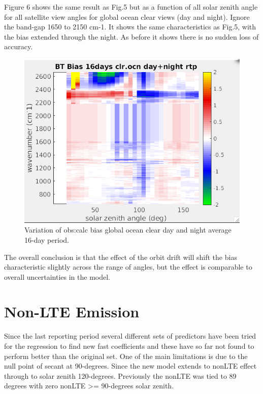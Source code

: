 \documentclass[11pt,twocolumn]{article}
\begin{document}
Figure 6 shows the same result as Fig.5 but as a function of all solar zenith angle
for all satellite view angles for global ocean clear views (day and night). Ignore
the band-gap 1650 to 2150 cm-1. It shows the same characteristics as Fig.5,
with the bias extended through the night. As before it shows there is no sudden
loss of accuracy.

\begin{figure}[htbp]
\centering
\includegraphics[width=\linewidth]{./Figs/airs_oc_bias_vs_solzen_day_night_glob_ocn_clr.png}
\caption{\label{fig:orgcb99237}Variation of obs:calc bias global ocean clear day and night average 16-day period.}
\end{figure}

The overall conclusion is that the effect of the orbit drift will shift the bias
characteristic slightly across the range of angles, but the effect is comparable
to overall uncertainties in the model.

\section{Non-LTE Emission}
\label{sec:org09593b6}

Since the last reporting period several different sets of predictors have been tried
for the regression to find new fast coefficients and these have so far not
found to perform better than the original set. One of the main limitations is
due to the null point of secant at 90-degrees. Since the new model extends to
nonLTE effect through to solar zenith 120-degrees. Previously the nonLTE was
tied to 89 degrees with zero nonLTE >= 90-degrees solar zenith.
\end{document}
